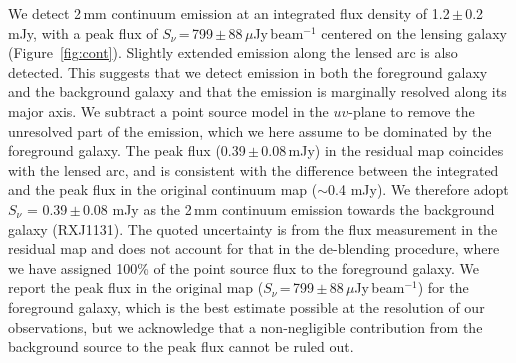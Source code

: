 \documentclass[]{emulateapj}
\newcommand{\pmOne}{\mbox{$^{-1}$}\xspace}
\newcommand{\pmm}{\,$\pm$\,}
\newcommand{\Fig}[1]{Figure~\ref{fig:#1}}
\begin{document}
We detect 2\,mm continuum emission at an
integrated flux density of
1.2\pmm0.2 mJy, with a peak flux of
$S_{\nu}$\,=\,799\pmm88\,$\mu$Jy\,beam\pmOne
centered on the lensing galaxy (\Fig{cont}). Slightly extended emission
along the lensed arc is also detected.
This suggests that we detect emission in both
the foreground galaxy and the background galaxy and that the
emission is marginally resolved along its major axis.
We subtract a point source model in the $uv$-plane to remove the unresolved part of the
emission, which we here assume to be dominated by the foreground galaxy. The peak flux (0.39\,$\pm$\,0.08\,mJy)
in the residual map coincides with the lensed arc, and is consistent with
the difference between the integrated and the peak flux in the
original continuum map ($\sim$0.4 mJy). We therefore adopt
$S_{\nu}$ = 0.39\pmm0.08 mJy as the 2\,mm continuum emission towards
the background galaxy (RXJ1131).
The quoted uncertainty is from the flux measurement in the residual map and does not account for that in the de-blending procedure, where we have assigned 100\% of the point source flux to the foreground galaxy.
We report the peak flux in the original map
($S_{\nu}$\,=\,799\pmm88\,$\mu$Jy\,beam\pmOne) for the foreground galaxy, which
is the best estimate possible at the resolution of our observations, but we acknowledge that a non-negligible contribution from the background source to the peak flux cannot be ruled out.
\end{document}
